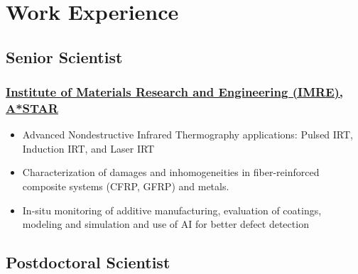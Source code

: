 \documentclass{my_cv}%
\begin{document}
\section{Work Experience}
\vspace{1.0em}
\subsection{Senior Scientist}
\subsubsection{\href{https://www.a-star.edu.sg/imre}{Institute of Materials Research and Engineering (IMRE), A*STAR}}
\begin{itemize}[leftmargin=0.15in]
\setlength\itemsep{-0.1em}
\color{mygray}
\item Advanced Nondestructive Infrared Thermography applications: Pulsed IRT, Induction IRT, and Laser IRT
\item Characterization of damages and inhomogeneities in fiber-reinforced composite systems (CFRP, GFRP) and metals.
\item In-situ monitoring of additive manufacturing, evaluation of coatings, modeling and simulation and use of AI for better defect detection 
\end{itemize}%
{\color{mygray1} \hdashrule[0.1ex]{18.8cm}{0.2mm}{1mm}}
\subsection{Postdoctoral Scientist}
\end{document}
